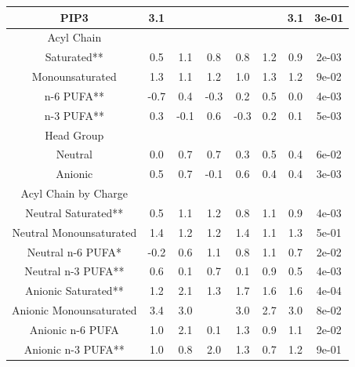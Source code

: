 \documentclass[9pt]{article}
\begin{document}
\begin{table}
{\begin{tabular}{| c || ccccc |cc|}
PIP3     &               3.1 &                &                 &                 &                 &  3.1 &  3e-01 \\
        \hline
Acyl Chain  &&&&&&&\\
Saturated**      &               0.5 &               1.1 &                0.8 &                0.8 &                1.2 &  0.9 &  2e-03 \\
Monounsaturated      &               1.3 &               1.1 &                1.2 &                1.0 &                1.3 &  1.2 &  9e-02 \\
n-6 PUFA**      &              -0.7 &               0.4 &               -0.3 &                0.2 &                0.5 &  0.0 &  4e-03 \\
n-3 PUFA**      &               0.3 &              -0.1 &                0.6 &               -0.3 &                0.2 &  0.1 &  5e-03 \\
        \hline
Head Group &&&&&&&\\
Neutral &               0.0 &               0.7 &                0.7 &                0.3 &                0.5 &  0.4 &  6e-02 \\
Anionic &               0.5 &               0.7 &               -0.1 &                0.6 &                0.4 &  0.4 &  3e-03 \\
        \hline
Acyl Chain by Charge &&&&&&&\\
Neutral Saturated**    &               0.5 &               1.1 &                1.2 &                0.8 &                1.1 &  0.9 &  4e-03 \\
Neutral Monounsaturated    &               1.4 &               1.2 &                1.2 &                1.4 &                1.1 &  1.3 &  5e-01 \\
Neutral n-6 PUFA*    &              -0.2 &               0.6 &                1.1 &                0.8 &                1.1 &  0.7 &  2e-02 \\
Neutral n-3 PUFA**    &               0.6 &               0.1 &                0.7 &                0.1 &                0.9 &  0.5 &  4e-03 \\
Anionic Saturated**    &               1.2 &               2.1 &                1.3 &                1.7 &                1.6 &  1.6 &  4e-04 \\
Anionic Monounsaturated    &               3.4 &               3.0 &                 &                3.0 &                2.7 &  3.0 &  8e-02 \\
Anionic n-6 PUFA    &               1.0 &               2.1 &                0.1 &                1.3 &                0.9 &  1.1 &  2e-02 \\
Anionic n-3 PUFA**    &               1.0 &               0.8 &                2.0 &                1.3 &                0.7 &  1.2 &  9e-01 \\
\hline
\end{tabular}}
\end{table}
\end{document}
